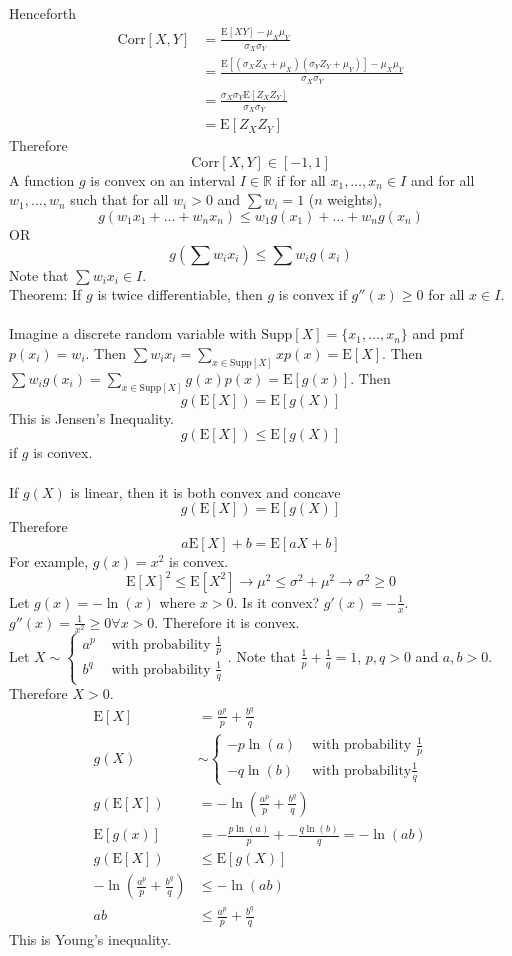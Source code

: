 \documentclass[12pt]{article}
\newcommand{\supp}[1]{\text{Supp}[ #1 ]}
\newcommand{\set}[1]{\Big\{ #1 \Big\}}
\newcommand{\expected}[1]{\mathrm{E}[#1]}
\newcommand{\corr}[1]{\mathrm{Corr}[#1]}
\begin{document}
Henceforth $$ \begin{aligned} \corr{X,Y} &= \frac{\expected{XY} - \mu_X\mu_Y}{\sigma_X\sigma_Y} \\ &= \frac{\expected{(\sigma_XZ_X + \mu_X)(\sigma_YZ_Y + \mu_Y)} - \mu_X\mu_Y}{\sigma_X\sigma_Y} \\ &= \frac{\sigma_X\sigma_Y \expected{Z_XZ_Y}}{\sigma_X\sigma_Y} \\ &= \expected{Z_XZ_Y} \end{aligned} $$ Therefore $$\corr{X,Y} \in [-1,1] $$
A function $g$ is convex on an interval $I \in \mathbb{R}$ if for all $x_1, \dots, x_n \in I$ and for all $w_1, \dots, w_n$ such that for all $w_i > 0$ and $\sum w_i = 1$ ($n$ weights), 
$$ g(w_1x_1 + \dots + w_nx_n) \leq w_1g(x_1) + \dots + w_ng(x_n) $$ OR
 $$g(\sum w_ix_i) \leq \sum w_ig(x_i) $$ Note that $\sum w_ix_i \in I$. \\ 
 Theorem: If $g$ is twice differentiable, then $g$ is convex if $g''(x) \geq 0$ for all $x \in I$. \\~\\
Imagine a discrete random variable with $\supp{X} = \set{x_1, \dots, x_n} $ and pmf $p(x_i) = w_i$. Then $\sum w_i x_i = \sum_{x \in \supp{X}} xp(x) = \expected{X}$. Then $\sum w_ig(x_i) = \sum_{x \in \supp{X}} g(x)p(x) = \expected{g(x)}$. Then $$g(\expected{X}) = \expected{g(X)} $$ This is Jensen's Inequality. 
$$g(\expected{X}) \leq \expected{g(X)}$$ if $g$ is convex. \\~\\
If $g(X)$ is linear, then it is both convex and concave $$g(\expected{X}) = \expected{g(X)} $$ Therefore $$a\expected{X} + b = \expected{aX + b} $$ 
For example, $g(x) = x^2$ is convex. 
$$ \expected{X}^2 \leq \expected{X^2} \to \mu^2 \leq \sigma^2 + \mu^2 \to \sigma^2 \geq 0 $$ 
Let $g(x) = -\ln(x)$ where $x > 0$. Is it convex? $g'(x) = -\frac{1}{x}$. $g''(x) = \frac{1}{x^2} \geq 0 \forall x > 0$. Therefore it is convex. \\
Let $X \sim \begin{cases} a^p &\text{ with probability } \frac{1}{p} \\ b^q &\text{ with probability } \frac{1}{q} \end{cases} $. Note that $\frac{1}{p} + \frac{1}{q} = 1$, $p,q > 0$ and $a,b>0$. Therefore $X > 0$. $$ \begin{aligned} \expected{X} &= \frac{a^p}{p} + \frac{b^q}{q} \\ g(X) &\sim \begin{cases} -p\ln(a) &\text{ with probability } \frac{1}{p} \\ -q\ln(b) &\text{ with probability} \frac{1}{q} \end{cases} \\ g(\expected{X}) &= -\ln( \frac{a^p}{p} + \frac{b^q}{q}) \\ \expected{g(x)} &= -\frac{p\ln(a)}{p} + -\frac{q\ln(b)}{q} = -\ln(ab) \\ g(\expected{X}) &\leq \expected{g(X)} \\ -\ln( \frac{a^p}{p} + \frac{b^q}{q}) &\leq -\ln(ab) \\ ab &\leq \frac{a^p}{p} + \frac{b^q}{q} \end{aligned} $$ This is Young's inequality. \\
\end{document}
